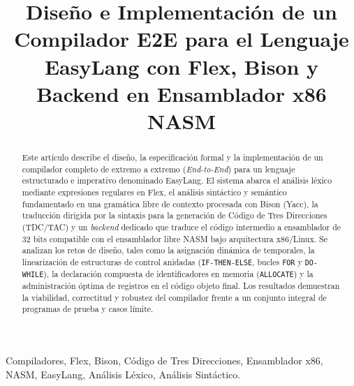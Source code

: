\documentclass[conference]{IEEEtran}
\begin{document}
\title{Diseño e Implementación de un Compilador E2E para el Lenguaje EasyLang con Flex, Bison y Backend en Ensamblador x86 NASM}

\author{
}

\maketitle

\begin{abstract}
Este artículo describe el diseño, la especificación formal y la implementación de un compilador completo de extremo a extremo (\textit{End-to-End}) para un lenguaje estructurado e imperativo denominado EasyLang. El sistema abarca el análisis léxico mediante expresiones regulares en Flex, el análisis sintáctico y semántico fundamentado en una gramática libre de contexto procesada con Bison (Yacc), la traducción dirigida por la sintaxis para la generación de Código de Tres Direcciones (TDC/TAC) y un \textit{backend} dedicado que traduce el código intermedio a ensamblador de 32 bits compatible con el ensamblador libre NASM bajo arquitectura x86/Linux. Se analizan los retos de diseño, tales como la asignación dinámica de temporales, la linearización de estructuras de control anidadas (\texttt{IF-THEN-ELSE}, bucles \texttt{FOR} y \texttt{DO-WHILE}), la declaración compuesta de identificadores en memoria (\texttt{ALLOCATE}) y la administración óptima de registros en el código objeto final. Los resultados demuestran la viabilidad, correctitud y robustez del compilador frente a un conjunto integral de programas de prueba y casos límite.
\end{abstract}

\begin{IEEEkeywords}
Compiladores, Flex, Bison, Código de Tres Direcciones, Ensamblador x86, NASM, EasyLang, Análisis Léxico, Análisis Sintáctico.
\end{IEEEkeywords}
\end{document}
